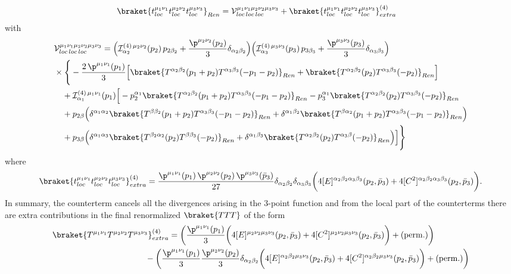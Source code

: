 \documentclass[a4paper,11pt,openright,twoside]{book}
\let\a=\alpha   \let\b=\beta   \let\g=\gamma   \let\d=\delta
\numberwithin{equation}{section}
\begin{document}
{{\begin{align}
	&\braket{t_{loc}^{\mu_1\nu_1}t_{loc}^{\mu_2\nu_2}t_{loc}^{\mu_3\nu_3}}_{Ren}= \mathcal{V}^{\mu_1\nu_1\mu_2\nu_2\mu_3\nu_3}_{loc\,loc\,loc} +\braket{t_{loc}^{\mu_1\nu_1}t_{loc}^{\mu_2\nu_2}t_{loc}^{\mu_3\nu_3}}^{(4)}_{extra}
\end{align}
with
\begin{align}
	&\mathcal{V}^{\mu_1\nu_1\mu_2\nu_2\mu_3\nu_3}_{loc\,loc\,loc}=\Big(\mathcal{I}^{(4)\,\mu_2\nu_2}_{\a_2}(p_2)\,p_{2\b_2}+\frac{\p^{\mu_2\nu_2}(p_2)}{3}\d_{\a_2\b_2}\Big)\Big(\mathcal{I}^{(4)\,\mu_3\nu_3}_{\a_3}(p_3)\,p_{3\b_3}+\frac{\p^{\mu_3\nu_3}(p_3)}{3}\d_{\a_3\b_3}\Big)\notag\\
	&\times\Bigg\{-\frac{2\,\p^{\mu_1\nu_1}(p_1)}{3}\Big[\braket{T^{\a_2\b_2}(p_1+p_2)T^{\a_3\b_3}(-p_1-p_2)}_{Ren}+\braket{T^{\a_2\b_2}(p_2)T^{\a_3\b_3}(-p_2)}_{Ren}\Big]
	\notag\\
	&\quad+\mathcal{I}^{(4)\,\mu_1\nu_1}_{\a_1}(p_1)\Big[-p_2^{\a_1}\braket{T^{\a_2\b_2}(p_1+p_2)T^{\a_3\b_3}(-p_1-p_2)}_{Ren}-p_3^{\a_1}\braket{T^{\a_2\b_2}(p_2)T^{\a_3\b_3}(-p_2)}_{Ren}\notag\\
	&\quad+p_{2\b}\Big(\d^{\a_1\a_2}\braket{T^{\b\b_2}(p_1+p_2)T^{\a_3\b_3}(-p_1-p_2)}_{Ren}+\d^{\a_1\b_2}\braket{T^{\b\a_2}(p_1+p_2)T^{\a_3\b_3}(-p_1-p_2)}_{Ren}\Big)\notag\\
	&\quad+p_{3\b}\Big(\d^{\a_1\a_3}\braket{T^{\b_2\a_2}(p_2)T^{\b\b_3}(-p_2)}_{Ren}+\d^{\a_1\b_3}\braket{T^{\a_2\b_2}(p_2)T^{\a_3\b}(-p_2)}_{Ren}\Big)\Big]\Bigg\}
\end{align}
where
\begin{align}
	\braket{t_{loc}^{\mu_1\nu_1}t_{loc}^{\mu_2\nu_2}t_{loc}^{\mu_3\nu_3}}^{(4)}_{extra}=\frac{\p^{\mu_1\nu_1}(p_1)\,\p^{\mu_2\nu_2}(p_2)\,\p^{\mu_3\nu_3}(\bar{p}_3)}{27}\d_{\a_2\b_2}\d_{\a_3\b_3}\bigg(4[E]^{\a_2\b_2\a_3\b_3}(p_2,\bar{p}_3)+4[C^2]^{\a_2\b_2\a_3\b_3}(p_2,\bar{p}_3)\bigg).
\end{align}
In summary, the counterterm cancels all the divergences arising in the 3-point function and from the local part of the counterterms there are extra contributions in the final renormalized $\braket{TTT}$ of the form
\begin{align}
	\braket{T^{\mu_1\nu_1}T^{\mu_2\nu_2}T^{\mu_3\nu_3}}^{(4)}_{extra}&=\left(\frac{\p^{\mu_1\nu_1}(p_1)}{3}\bigg(4[E]^{\mu_2\nu_2\mu_3\nu_3}(p_2,\bar{p}_3)+4[C^2]^{\mu_2\nu_2\mu_3\nu_3}(p_2,\bar{p}_3)\bigg)+(\text{perm.})\right)\notag\\
	&\hspace{-1cm}-\left(\frac{\p^{\mu_1\nu_1}(p_1)}{3}\frac{\p^{\mu_2\nu_2}(p_2)}{3}\d_{\a_2\b_2}\bigg(4[E]^{\a_2\b_2\mu_3\nu_3}(p_2,\bar{p}_3)+4[C^2]^{\a_2\b_2\mu_3\nu_3}(p_2,\bar{p}_3)\bigg) +(\text{perm.})\right)\notag\\

\end{align}}}
\end{document}
